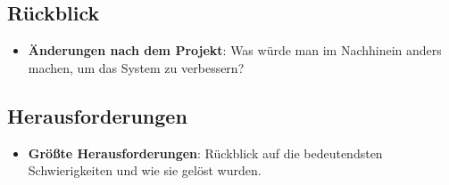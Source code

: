 \documentclass[
]{article}
\begin{document}
\subsection{Rückblick}
\begin{itemize}
    \item \textbf{Änderungen nach dem Projekt}: Was würde man im Nachhinein anders machen, um das System zu verbessern?
\end{itemize}

\subsection{Herausforderungen}
\begin{itemize}
    \item \textbf{Größte Herausforderungen}: Rückblick auf die bedeutendsten Schwierigkeiten und wie sie gelöst wurden.
\end{itemize}
\newpage
 \printbibliography[title={Quellen}]
\end{document}
